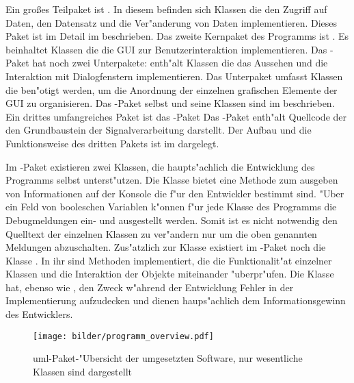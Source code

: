 Ein gro{\ss}es Teilpaket ist .
In diesem befinden sich Klassen die den Zugriff auf Daten, den Datensatz und die Ver"anderung von Daten implementieren.
Dieses Paket ist im Detail im  beschrieben.
Das zweite Kernpaket des Programms ist .
Es beinhaltet Klassen die die \ac{GUI} zur Benutzerinteraktion implementieren.
Das -Paket hat noch zwei Unterpakete:
 enth"alt Klassen die das Aussehen und die Interaktion mit Dialogfenstern implementieren.
Das Unterpaket  umfasst Klassen die ben"otigt werden, um die Anordnung der einzelnen grafischen Elemente der \ac{GUI} zu organisieren.
Das -Paket selbst und seine Klassen sind im  beschrieben.
Ein drittes umfangreiches Paket ist das -Paket
Das -Paket enth"alt Quellcode der den Grundbaustein der Signalverarbeitung darstellt.
Der Aufbau und die Funktionsweise des dritten Pakets ist im  dargelegt.

Im -Paket existieren zwei Klassen, die haupts"achlich die Entwicklung des Programms selbst unterst"utzen.
Die Klasse  bietet eine Methode zum ausgeben von Informationen auf der Konsole die f"ur den Entwickler bestimmt sind.
"Uber ein Feld von booleschen Variablen k"onnen f"ur jede Klasse des Programms die Debugmeldungen ein- und ausgestellt werden.
Somit ist es nicht notwendig den Quelltext der einzelnen Klassen zu ver"andern nur um die oben genannten Meldungen abzuschalten.
Zus"atzlich zur Klasse  existiert im -Paket noch die Klasse .
In ihr sind Methoden implementiert, die die Funktionalit"at einzelner Klassen und die Interaktion der Objekte miteinander "uberpr"ufen.
Die  Klasse hat, ebenso wie , den Zweck w"ahrend der Entwicklung Fehler in der Implementierung aufzudecken und dienen haups"achlich dem Informationsgewinn des Entwicklers.

\begin{figure}[htb]
\centering
\texttt{[image: bilder/programm\_overview.pdf]}
\caption[\acs{uml}-Paket-"Ubersicht der umgesetzten Software]{\ac{uml}-Paket-"Ubersicht der umgesetzten Software, nur wesentliche Klassen sind dargestellt}
\label{pic:paket_ubersicht}
\end{figure}

